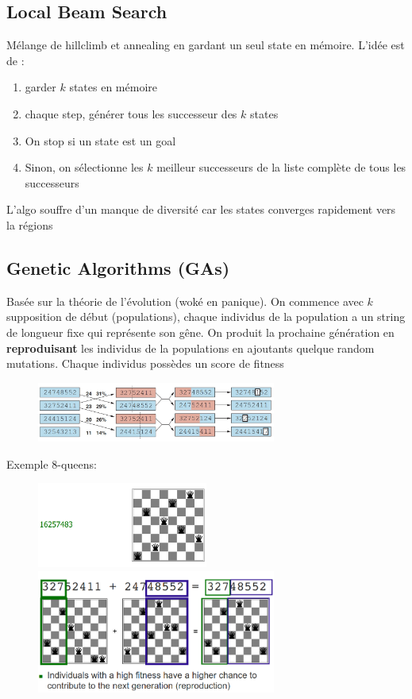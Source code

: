 	\subsection{Local Beam Search}
		Mélange de hillclimb et annealing en gardant un seul state en mémoire. L'idée est de :
		\begin{enumerate}
			\item garder $k$ states en mémoire
			\item chaque step, générer tous les successeur des $k$ states
			\item On stop si un state est un goal
			\item Sinon, on sélectionne les $k$ meilleur successeurs de la liste complète de tous les successeurs
		\end{enumerate}
		
		L'algo souffre d'un manque de diversité car les states converges rapidement vers la  régions
		
	\subsection{Genetic Algorithms (GAs)}
		Basée sur la théorie de l'évolution (woké en panique). On commence avec $k$ supposition de début (populations), chaque individus  de la population a un string de longueur fixe qui représente son gêne. On produit la prochaine génération en \textbf{reproduisant} les individus de la populations en ajoutants quelque random mutations. Chaque individus possèdes un score de fitness
		
		\begin{figure}[H]
			\centering
			\includegraphics[width=0.7\textwidth]{img/GA}
		\end{figure}
	
		Exemple 8-queens:
		\begin{figure}[htp]
			\centering
			\includegraphics[width=0.5\textwidth]{img/8QueenGA1.png}
			\includegraphics[width=0.7\textwidth]{img/8QueenGA2.png}
		\end{figure}
		

